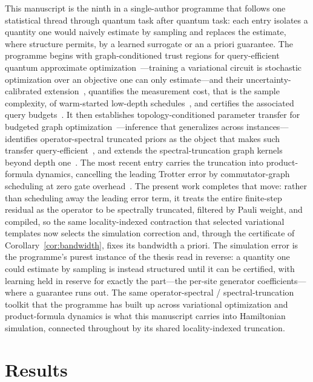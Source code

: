\documentclass[aps,prresearch,reprint,superscriptaddress,nofootinbib,amsmath,amssymb]{revtex4-2}
\begin{document}
This manuscript is the ninth in a single-author programme that follows one statistical thread through quantum task after quantum task: each entry isolates a quantity one would naively estimate by sampling and replaces the estimate, where structure permits, by a learned surrogate or an a priori guarantee. The programme begins with graph-conditioned trust regions for query-efficient quantum approximate optimization~\cite{huynh2026gctr}---training a variational circuit is stochastic optimization over an objective one can only estimate---and their uncertainty-calibrated extension~\cite{huynh2026gctrcalpro}, quantifies the measurement cost, that is the sample complexity, of warm-started low-depth schedules~\cite{huynh2026meascost}, and certifies the associated query budgets~\cite{huynh2026certqb}. It then establishes topology-conditioned parameter transfer for budgeted graph optimization~\cite{huynh2026paramxferB}---inference that generalizes across instances---identifies operator-spectral truncated priors as the object that makes such transfer query-efficient~\cite{huynh2026ostqaoa}, and extends the spectral-truncation graph kernels beyond depth one~\cite{huynh2026topoqaoa}. The most recent entry carries the truncation into product-formula dynamics, cancelling the leading Trotter error by commutator-graph scheduling at zero gate overhead~\cite{huynh2026topoham}. The present work completes that move: rather than scheduling away the leading error term, it treats the entire finite-step residual as the operator to be spectrally truncated, filtered by Pauli weight, and compiled, so the same locality-indexed contraction that selected variational templates now selects the simulation correction and, through the certificate of Corollary~\ref{cor:bandwidth}, fixes its bandwidth a priori. The simulation error is the programme's purest instance of the thesis read in reverse: a quantity one could estimate by sampling is instead structured until it can be certified, with learning held in reserve for exactly the part---the per-site generator coefficients---where a guarantee runs out. The same operator-spectral / spectral-truncation toolkit that the programme has built up across variational optimization and product-formula dynamics is what this manuscript carries into Hamiltonian simulation, connected throughout by its shared locality-indexed truncation.


\section{Results}
\label{sec:results}
\end{document}
